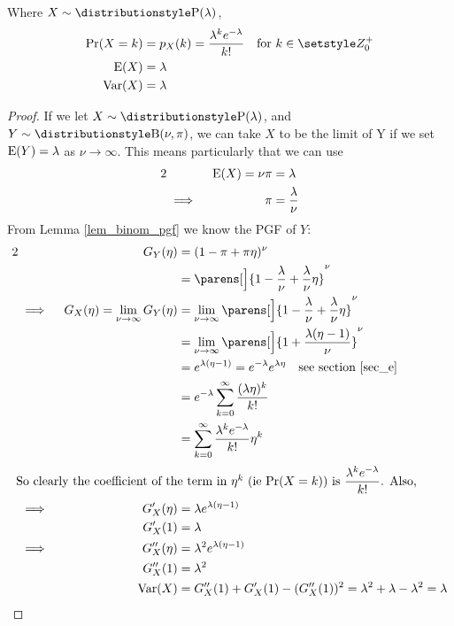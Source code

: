 \begin{theorem}
Where \(X \sim \Poisson(\lambda)\),
\begin{align*}
\Prob(X = k) &= p_X(k) = \frac{\lambda^k e^{-\lambda}}{k!}
    \quad \text{for \(k \in \Integers^+_0\)} \\
\Expect(X) &= \lambda \\
\Var(X) &= \lambda
\end{align*}
\end{theorem}
\begin{proof}
If we let \(X \sim \Poisson(\lambda)\), and \(Y \sim \Binomial(\nu, \pi)\),
we can take \(X\) to be the limit of Y if we set \(\operatorname{E}(Y) = \lambda\)
as \(\nu \to \infty\). This means particularly that we can use
\begin{alignat*}2
    && \Expect(X) = \nu \pi &= \lambda \\
    &\implies{}& \pi &= \frac \lambda \nu
\end{alignat*}
From Lemma \ref{lem_binom_pgf} we know the PGF of \(Y\):
\begin{alignat*}2
    && G_Y(\eta) &= (1 - \pi + \pi \eta)^\nu \\
    &&  &= \parens[\Big]{1 - \frac \lambda \nu + \frac \lambda \nu \eta}^\nu \\
    &\implies{}& G_X(\eta) = \lim_{\nu \to \infty}G_Y(\eta)
        &= \lim_{\nu \to \infty} \parens[\Big]{1 - \frac \lambda \nu
                                    + \frac \lambda \nu \eta}^\nu \\
    &&  &= \lim_{\nu \to \infty} \parens[\Big]
        {1 + \frac{\lambda(\eta - 1)}\nu}^\nu \\
    &&  &= e^{\lambda(\eta - 1)} = e^{-\lambda}e^{\lambda \eta}
        \quad \text{see section \ref{sec_e}} \\
    &&  &= e^{-\lambda} \sum_{k = 0}^\infty \frac{(\lambda \eta)^k}{k!} \\
    &&  &= \sum_{k = 0}^\infty \frac{\lambda ^k e^{-\lambda}}{k!} \eta^k \\
    \intertext{
    So clearly the coefficient of the term in \(\eta^k\) (ie \(\Prob(X = k)\))
    is \(\dfrac{\lambda^k e^{-\lambda}}{k!}\). Also,}
    &\implies{}& G_X'(\eta) &= \lambda e^{\lambda(\eta - 1)} \\
    && G_X'(1) &= \lambda \\
    &\implies{}& G_X''(\eta) &= \lambda^2 e^{\lambda(\eta - 1)} \\
    && G_X''(1) &= \lambda^2 \\
    && \Var(X) &= G_X''(1) + G_X'(1) - (G_X''(1))^2
        = \lambda^2 + \lambda - \lambda^2 = \lambda \qedhere
\end{alignat*}
\end{proof}

